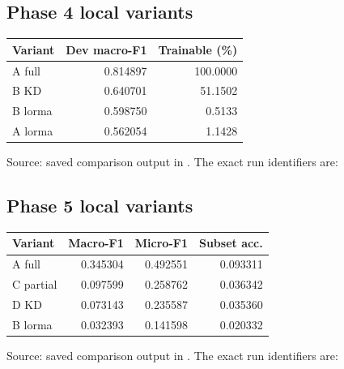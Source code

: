 \subsection{Phase 4 local variants}
\begin{table}[H]\centering\small
\begin{tabular}{lrr}
\toprule Variant & Dev macro-F1 & Trainable (\%)\\\midrule
A full & 0.814897 & 100.0000\\
B KD & 0.640701 & 51.1502\\
B lorma & 0.598750 & 0.5133\\
A lorma & 0.562054 & 1.1428\\
\bottomrule\end{tabular}
\end{table}
Source: saved comparison output in . The exact run identifiers are:
\par\noindent\small{}\normalsize
\par\noindent\small{}\normalsize
\par\noindent\small{}\normalsize
\par\noindent\small{}\normalsize
\subsection{Phase 5 local variants}
\begin{table}[H]\centering\small
\begin{tabular}{lrrr}
\toprule Variant & Macro-F1 & Micro-F1 & Subset acc.\\\midrule
A full & 0.345304 & 0.492551 & 0.093311\\
C partial & 0.097599 & 0.258762 & 0.036342\\
D KD & 0.073143 & 0.235587 & 0.035360\\
B lorma & 0.032393 & 0.141598 & 0.020332\\
\bottomrule\end{tabular}
\end{table}
Source: saved comparison output in . The exact run identifiers are:
\par\noindent\small{}\normalsize
\par\noindent\small{}\normalsize
\par\noindent\small{}\normalsize
\par\noindent\small{}\normalsize
